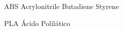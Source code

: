 \begin{siglas}
	\item[ABS] Acrylonitrile Butadiene Styrene
	\item[PLA] Ácido Polilático
\end{siglas}